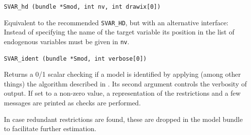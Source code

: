 \documentclass[a4paper,10pt]{article}
\newenvironment{funcdoc}[1]
{\noindent\hrulefill\newline\nopagebreak\texttt{#1}%
\nopagebreak\par\noindent\hrulefill%
\nopagebreak\par\nopagebreak\smallskip\nopagebreak\par}
{\bigskip}
\begin{document}
\begin{funcdoc}{SVAR\_hd (bundle *Smod, int nv, int drawix[0])}
\noindent Equivalent to the recommended \texttt{SVAR\_HD}, but with an alternative 
interface: 
Instead of specifying the name of the target variable its position in the 
list of endogenous variables must be given in \texttt{nv}.
\end{funcdoc}


\begin{funcdoc}{SVAR\_ident (bundle *Smod, int verbose[0])}
  \noindent Returns a 0/1 scalar checking if a model is identified by applying (among other things) 
  the algorithm described in \cite{AG}.  
  Its second argument controls the verbosity of output. 
  If set to a non-zero value, a representation of the restrictions and
  a few messages are printed as checks are performed.
  
  In case redundant restrictions are found, these are dropped in the 
  model bundle to facilitate further estimation.
\end{funcdoc}
\end{document}
